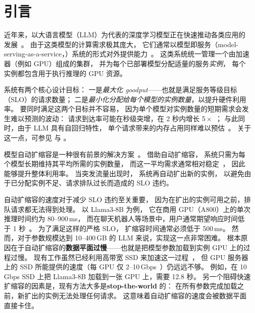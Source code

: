 \section{引言}
\label{sec:intro}

\noindent
近年来，以大语言模型（LLM）为代表的深度学习模型正在快速推动各类应用的发展~\cite{aws-rekognition,chatgpt,copilot,sora,stability-ai}。
由于这类模型的计算需求极其庞大，
它们通常以模型即服务（model-serving-as-a-service，{\maas}）系统的形式对外提供能力~\cite{serverless-together-ai,serverless-ray,deepinfra,DBLP:conf/asplos/YangZLZLZCL22,ali-serverless-llm,aws-serverless-llm,DBLP:journals/corr/abs-2401-14351}。
这类系统统一管理一个由加速器（例如 GPU）组成的集群，
并为每个已部署模型分配适量的服务\emph{实例}，
每个实例都包含用于执行推理的 GPU 资源。

{\maas} 系统有两个核心设计目标：
一是\emph{最大化 goodput}——也就是满足服务等级目标（SLO）的请求数量；
二是\emph{最小化分配给每个模型的实例数量}，以提升硬件利用率。
要同时满足这两个目标并不容易，
因为单个模型对实例数量的短期需求会发生难以预测的波动：
请求到达率可能在秒级突增，在 2 秒内增长 5\,$\times$~\cite{alpaserve,DBLP:conf/nsdi/0025TKS23}；
与此同时，由于 LLM 具有自回归特性，
单个请求带来的内存占用同样难以预估~\cite{alpaserve,DBLP:conf/nsdi/0025TKS23,DBLP:journals/corr/abs-2401-14351}。
关于这一点，可参见 {} 与 \textsection{\ref{sec:problem-statement}}。

模型自动扩缩容是一种很有前景的解决方案~\cite{DBLP:conf/asplos/YangZLZLZCL22,serverless-ray,DBLP:journals/corr/abs-2401-14351,kserve}。
借助自动扩缩容，
{\maas} 系统只需为每个模型长期维持其平均所需的实例数量，
而这一平均需求通常相对稳定~\cite{wang2024burstgpt}，
因此能够提升整体利用率。
当突发流量出现时，
系统再自动扩出新的实例，
以避免由于已分配实例不足、请求排队过长而造成的 SLO 违约。

自动扩缩容的速度对于减少 SLO 违约至关重要，
因为在扩出的实例可用之前，排队请求都无法得到处理。
以 Llama3-8B 为例，
它在商用 GPU（A800）上的单次推理时间约为 80--900\,ms，
而在聊天机器人等场景中，用户通常期望响应时间低于 1 秒~\cite{latency-study,DBLP:conf/osdi/ZhongLCHZL0024,aws-latency}。
为了满足这样的严格 SLO，
扩缩容时间通常必须低于 500\,ms。
然而，对于参数规模达到 10--400\,GB 的 LLM 来说，实现这一点非常困难。
根本原因在于自动扩缩容的\textbf{数据平面过慢}——也就是把模型参数加载到实例 GPU 上的过程过慢。
现有工作虽然已经利用高带宽 SSD 来加速这一过程~\cite{DBLP:journals/corr/abs-2401-14351}，
但 GPU 服务器上的 SSD 所能提供的速度（每 GPU 仅 2--10\,Gbps~\cite{googleinstance,awsinstance,volcanoinstance}）仍远远不够。
例如，在 10\,Gbps SSD 上把 Llama3-8B 加载到一张 GPU 上，需要 12.8 秒。
另一个阻碍快速扩缩容的因素是，现有方法大多是\textbf{stop-the-world} 的：
在所有参数完成加载之前，新扩出的实例无法处理任何请求。
这意味着自动扩缩容的速度会被数据平面直接卡住。

